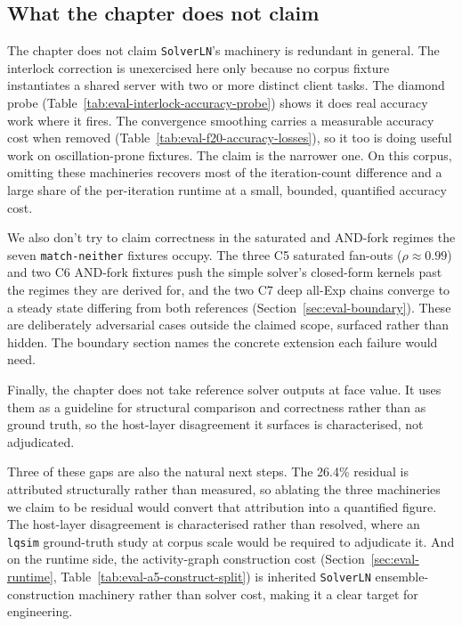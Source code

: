\subsection{What the chapter does not claim}
\label{sec:eval-notclaim}

The chapter does not claim \texttt{SolverLN}'s machinery is redundant in general. The interlock correction is unexercised here only because no corpus fixture instantiates a shared server with two or more distinct client tasks. The diamond probe (Table~\ref{tab:eval-interlock-accuracy-probe}) shows it does real accuracy work where it fires. The convergence smoothing carries a measurable accuracy cost when removed (Table~\ref{tab:eval-f20-accuracy-losses}), so it too is doing useful work on oscillation-prone fixtures. The claim is the narrower one. On this corpus, omitting these machineries recovers most of the iteration-count difference and a large share of the per-iteration runtime at a small, bounded, quantified accuracy cost.

We also don't try to claim correctness in the saturated and AND-fork regimes the seven \texttt{match-neither} fixtures occupy. The three C5 saturated fan-outs ($\rho \approx 0.99$) and two C6 AND-fork fixtures push the simple solver's closed-form kernels past the regimes they are derived for, and the two C7 deep all-Exp chains converge to a steady state differing from both references (Section~\ref{sec:eval-boundary}). These are deliberately adversarial cases outside the claimed scope, surfaced rather than hidden. The boundary section names the concrete extension each failure would need.

Finally, the chapter does not take reference solver outputs at face value. It uses them as a guideline for structural comparison and correctness rather than as ground truth, so the host-layer disagreement it surfaces is characterised, not adjudicated.

Three of these gaps are also the natural next steps. The 26.4\% residual is attributed structurally rather than measured, so ablating the three machineries we claim to be residual would convert that attribution into a quantified figure. The host-layer disagreement is characterised rather than resolved, where an \texttt{lqsim} ground-truth study at corpus scale would be required to adjudicate it. And on the runtime side, the activity-graph construction cost (Section~\ref{sec:eval-runtime}, Table~\ref{tab:eval-a5-construct-split}) is inherited \texttt{SolverLN} ensemble-construction machinery rather than solver cost, making it a clear target for engineering.



